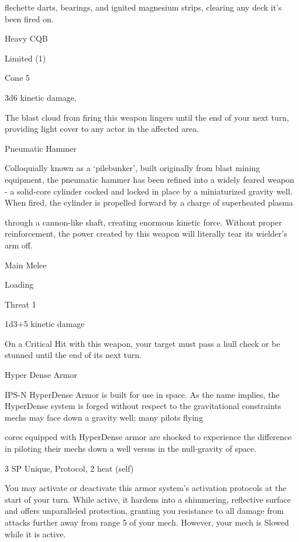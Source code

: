 flechette darts, bearings, and ignited magnesium strips, clearing any deck it’s been fired on.   

Heavy CQB
 
Limited (1)
 
Cone 5
 
3d6 kinetic damage. 
 
The blast cloud from firing this weapon lingers until the end of your next turn, providing light  
cover to any actor in the affected area.
 

Pneumatic Hammer  

Colloquially known as a ‘pilebunker’, built originally from blast mining equipment, the pneumatic hammer  
has been refined into a widely feared weapon - a solid-core cylinder cocked and locked in place by a  
miniaturized gravity well. When fired, the cylinder is propelled forward by a charge of superheated plasma  

through a cannon-like shaft, creating enormous kinetic force. Without proper reinforcement, the power  
created by this weapon will literally tear its wielder’s arm off.  

Main Melee
 
Loading
 
Threat 1
 
1d3+5 kinetic damage
 
On a Critical Hit with this weapon, your target must pass a hull check or be stunned until the end  
of its next turn.
 

                                                                                                                    


Hyper Dense Armor  

IPS-N HyperDense Armor is built for use in space. As the name implies, the HyperDense system is forged  
without respect to the gravitational constraints mechs may face down a gravity well; many pilots flying  

cores equipped with HyperDense armor are shocked to experience the difference in piloting their mechs  
down a well versus in the null-gravity of space.   

3 SP  
Unique, Protocol, 2 heat (self)
 
You may activate or deactivate this armor system’s activation protocols at the start of your turn.  
While active, it hardens into a shimmering, reflective surface and offers unparalleled protection,  
granting you resistance to all damage from attacks further away from range 5 of your mech.  
However, your mech is Slowed while it is active. 
 